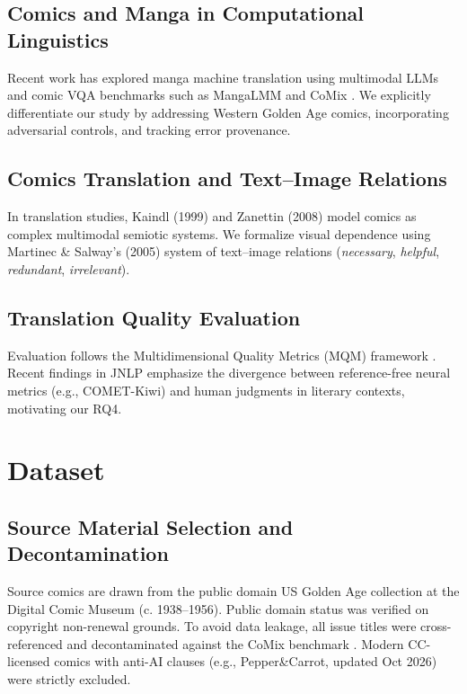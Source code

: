 \documentclass[11pt,a4paper]{article}
\begin{document}
\subsection{Comics and Manga in Computational Linguistics}
Recent work has explored manga machine translation using multimodal LLMs \cite{lippmann2025context} and comic VQA benchmarks such as MangaLMM \cite{baek2026manga} and CoMix \cite{vivoli2024comix}. We explicitly differentiate our study by addressing Western Golden Age comics, incorporating adversarial controls, and tracking error provenance.

\subsection{Comics Translation and Text--Image Relations}
In translation studies, Kaindl (1999) and Zanettin (2008) model comics as complex multimodal semiotic systems. We formalize visual dependence using Martinec \& Salway's (2005) system of text--image relations (\textit{necessary}, \textit{helpful}, \textit{redundant}, \textit{irrelevant}).

\subsection{Translation Quality Evaluation}
Evaluation follows the Multidimensional Quality Metrics (MQM) framework \cite{lommel2014multidimensional}. Recent findings in JNLP \cite{yirmibesoglu2026lexical} emphasize the divergence between reference-free neural metrics (e.g., COMET-Kiwi) and human judgments in literary contexts, motivating our RQ4.

\section{Dataset}

\subsection{Source Material Selection and Decontamination}
Source comics are drawn from the public domain US Golden Age collection at the Digital Comic Museum (c. 1938--1956). Public domain status was verified on copyright non-renewal grounds. To avoid data leakage, all issue titles were cross-referenced and decontaminated against the CoMix benchmark \cite{vivoli2024comix}. Modern CC-licensed comics with anti-AI clauses (e.g., Pepper\&Carrot, updated Oct 2026) were strictly excluded.
\end{document}
